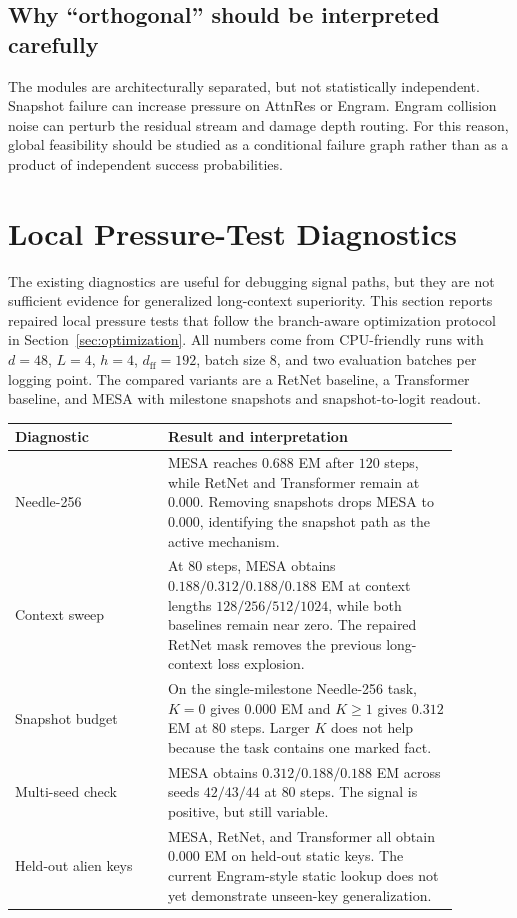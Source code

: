 \documentclass[11pt]{article}
\begin{document}
\subsection{Why ``orthogonal'' should be interpreted carefully}

The modules are architecturally separated, but not statistically independent. Snapshot failure can increase pressure on AttnRes or Engram. Engram collision noise can perturb the residual stream and damage depth routing. For this reason, global feasibility should be studied as a conditional failure graph rather than as a product of independent success probabilities.

\section{Local Pressure-Test Diagnostics}
\label{sec:local-pressure}

The existing diagnostics are useful for debugging signal paths, but they are not sufficient evidence for generalized long-context superiority. This section reports repaired local pressure tests that follow the branch-aware optimization protocol in Section~\ref{sec:optimization}. All numbers come from CPU-friendly runs with $d=48$, $L=4$, $h=4$, $d_{\mathrm{ff}}=192$, batch size $8$, and two evaluation batches per logging point. The compared variants are a RetNet baseline, a Transformer baseline, and MESA with milestone snapshots and snapshot-to-logit readout.

\begin{center}
\begin{tabular}{p{0.30\linewidth}p{0.58\linewidth}}
\toprule
Diagnostic & Result and interpretation \\
\midrule
Needle-256 & MESA reaches $0.688$ EM after $120$ steps, while RetNet and Transformer remain at $0.000$. Removing snapshots drops MESA to $0.000$, identifying the snapshot path as the active mechanism. \\
Context sweep & At $80$ steps, MESA obtains $0.188/0.312/0.188/0.188$ EM at context lengths $128/256/512/1024$, while both baselines remain near zero. The repaired RetNet mask removes the previous long-context loss explosion. \\
Snapshot budget & On the single-milestone Needle-256 task, $K=0$ gives $0.000$ EM and $K\geq1$ gives $0.312$ EM at $80$ steps. Larger $K$ does not help because the task contains one marked fact. \\
Multi-seed check & MESA obtains $0.312/0.188/0.188$ EM across seeds $42/43/44$ at $80$ steps. The signal is positive, but still variable. \\
Held-out alien keys & MESA, RetNet, and Transformer all obtain $0.000$ EM on held-out static keys. The current Engram-style static lookup does not yet demonstrate unseen-key generalization. \\
\bottomrule
\end{tabular}
\end{center}
\end{document}
